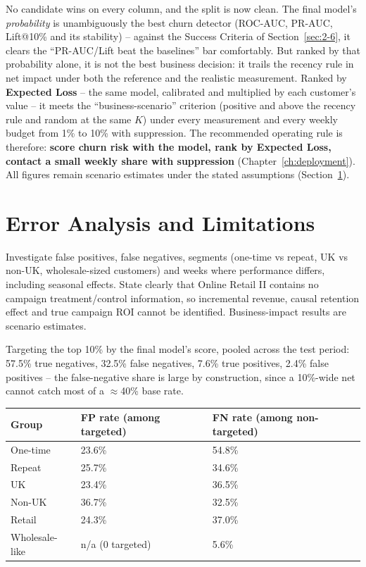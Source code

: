 No candidate wins on every column, and the split is now clean. The final model's \emph{probability} is unambiguously the best churn detector (ROC-AUC, PR-AUC, Lift@10\% and its stability) -- against the Success Criteria of Section~\ref{sec:2-6}, it clears the ``PR-AUC/Lift beat the baselines'' bar comfortably. But ranked by that probability alone, it is not the best business decision: it trails the recency rule in net impact under both the reference and the realistic measurement. Ranked by \textbf{Expected Loss} -- the same model, calibrated and multiplied by each customer's value -- it meets the ``business-scenario'' criterion (positive and above the recency rule and random at the same $K$) under every measurement and every weekly budget from 1\% to 10\% with suppression. The recommended operating rule is therefore: \textbf{score churn risk with the model, rank by Expected Loss, contact a small weekly share with suppression} (Chapter~\ref{ch:deployment}). All figures remain scenario estimates under the stated assumptions (Section~\ref{sec:7-12}).

\section{Error Analysis and Limitations}
\label{sec:7-12}

Investigate false positives, false negatives, segments (one-time vs repeat, UK vs non-UK, wholesale-sized customers) and weeks where performance differs, including seasonal effects. State clearly that Online Retail II contains no campaign treatment/control information, so incremental revenue, causal retention effect and true campaign ROI cannot be identified. Business-impact results are scenario estimates.

Targeting the top 10\% by the final model's score, pooled across the test period: 57.5\% true negatives, 32.5\% false negatives, 7.6\% true positives, 2.4\% false positives -- the false-negative share is large by construction, since a 10\%-wide net cannot catch most of a $\approx$40\% base rate.

\begin{center}
\begin{tabular}{@{}p{3.6cm}p{2.6cm}p{2.6cm}@{}}
    \toprule
    Group & FP rate (among targeted) & FN rate (among non-targeted) \\
    \midrule
    One-time & 23.6\% & 54.8\% \\
    Repeat & 25.7\% & 34.6\% \\
    \midrule
    UK & 23.4\% & 36.5\% \\
    Non-UK & 36.7\% & 32.5\% \\
    \midrule
    Retail & 24.3\% & 37.0\% \\
    Wholesale-like & n/a (0 targeted) & 5.6\% \\
    \bottomrule
\end{tabular}
\end{center}

